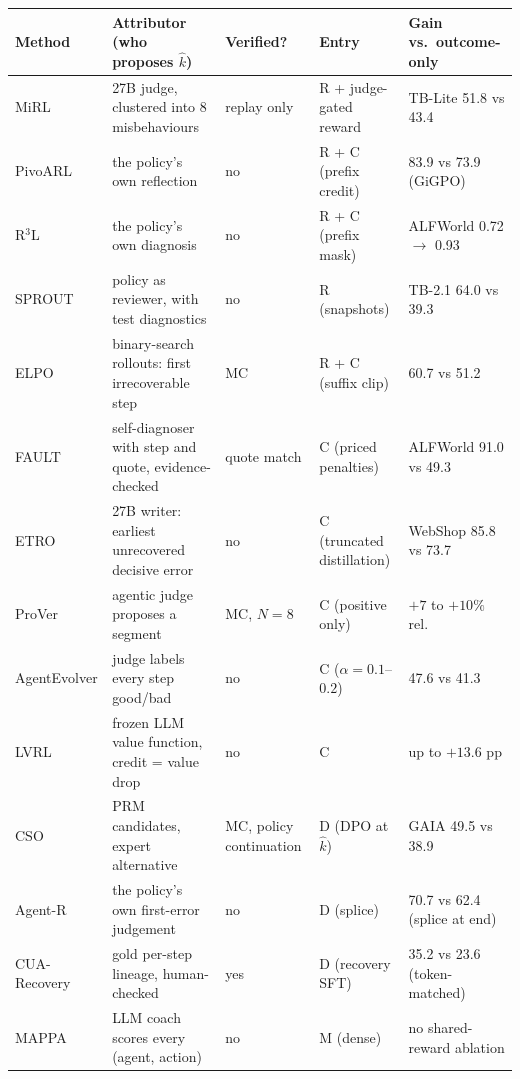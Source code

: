 \begin{table}[h]\centering\scriptsize
\setlength{\tabcolsep}{3pt}
\begin{tabularx}{\linewidth}{@{}l >{\RaggedRight\hsize=1.05\hsize}X l >{\RaggedRight\hsize=0.95\hsize}X l@{}}\toprule
Method & Attributor (who proposes $\hat k$) & Verified? & Entry & Gain vs.\ outcome-only \\\midrule
MiRL \cite{tian2026mirl} & 27B judge, clustered into 8 misbehaviours & replay only & R + judge-gated reward & TB-Lite 51.8 vs 43.4 \\
PivoARL \cite{guo2026pivoarl} & the policy's own reflection & no & R + C (prefix credit) & 83.9 vs 73.9 (GiGPO) \\
R$^3$L \cite{shi2026r3l} & the policy's own diagnosis & no & R + C (prefix mask) & ALFWorld 0.72 $\to$ 0.93 \\
SPROUT \cite{liu2026sprout} & policy as reviewer, with test diagnostics & no & R (snapshots) & TB-2.1 64.0 vs 39.3 \\
ELPO \cite{liang2026elpo} & binary-search rollouts: first irrecoverable step & MC & R + C (suffix clip) & 60.7 vs 51.2 \\
FAULT \cite{zhu2026fault} & self-diagnoser with step and quote, evidence-checked & quote match & C (priced penalties) & ALFWorld 91.0 vs 49.3 \\
ETRO \cite{huang2026etro} & 27B writer: earliest unrecovered decisive error & no & C (truncated distillation) & WebShop 85.8 vs 73.7 \\
ProVer \cite{jung2026prover} & agentic judge proposes a segment & MC, $N{=}8$ & C (positive only) & $+7$ to $+10\%$ rel. \\
AgentEvolver \cite{agentevolver2025} & judge labels every step good/bad & no & C ($\alpha{=}0.1$--$0.2$) & 47.6 vs 41.3 \\
LVRL \cite{zhu2026lvrl} & frozen LLM value function, credit = value drop & no & C & up to $+13.6$ pp \\
CSO \cite{li2026cso} & PRM candidates, expert alternative & MC, policy continuation & D (DPO at $\hat k$) & GAIA 49.5 vs 38.9 \\
Agent-R \cite{yuan2025agentr} & the policy's own first-error judgement & no & D (splice) & 70.7 vs 62.4 (splice at end) \\
CUA-Recovery \cite{cuarecovery2026} & gold per-step lineage, human-checked & yes & D (recovery SFT) & 35.2 vs 23.6 (token-matched) \\
MAPPA \cite{li2026mappa} & LLM coach scores every (agent, action) & no & M (dense) & no shared-reward ablation \\

\end{tabularx}
\end{table}
